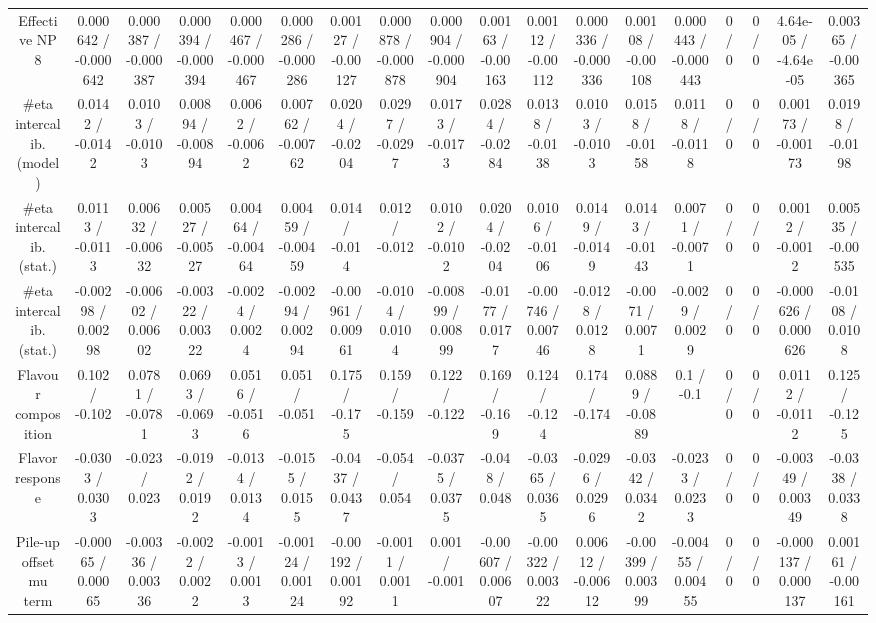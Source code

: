 \documentclass[10pt]{article}
\begin{document}
\begin{table}[htbp]
\begin{center}
\begin{tabular}{|c|c|c|c|c|c|c|c|c|c|c|c|c|c|c|c|c|c|}
  Effective NP 8 & 0.000642 / -0.000642 & 0.000387 / -0.000387 & 0.000394 / -0.000394 & 0.000467 / -0.000467 & 0.000286 / -0.000286 & 0.00127 / -0.00127 & 0.000878 / -0.000878 & 0.000904 / -0.000904 & 0.00163 / -0.00163 & 0.00112 / -0.00112 & 0.000336 / -0.000336 & 0.00108 / -0.00108 & 0.000443 / -0.000443 & 0 / 0 & 0 / 0 & 4.64e-05 / -4.64e-05 & 0.00365 / -0.00365 \\ 
  #eta intercalib. (model) & 0.0142 / -0.0142 & 0.0103 / -0.0103 & 0.00894 / -0.00894 & 0.0062 / -0.0062 & 0.00762 / -0.00762 & 0.0204 / -0.0204 & 0.0297 / -0.0297 & 0.0173 / -0.0173 & 0.0284 / -0.0284 & 0.0138 / -0.0138 & 0.0103 / -0.0103 & 0.0158 / -0.0158 & 0.0118 / -0.0118 & 0 / 0 & 0 / 0 & 0.00173 / -0.00173 & 0.0198 / -0.0198 \\ 
  #eta intercalib. (stat.) & 0.0113 / -0.0113 & 0.00632 / -0.00632 & 0.00527 / -0.00527 & 0.00464 / -0.00464 & 0.00459 / -0.00459 & 0.014 / -0.014 & 0.012 / -0.012 & 0.0102 / -0.0102 & 0.0204 / -0.0204 & 0.0106 / -0.0106 & 0.0149 / -0.0149 & 0.0143 / -0.0143 & 0.0071 / -0.0071 & 0 / 0 & 0 / 0 & 0.0012 / -0.0012 & 0.00535 / -0.00535 \\ 
  #eta intercalib. (stat.) & -0.00298 / 0.00298 & -0.00602 / 0.00602 & -0.00322 / 0.00322 & -0.0024 / 0.0024 & -0.00294 / 0.00294 & -0.00961 / 0.00961 & -0.0104 / 0.0104 & -0.00899 / 0.00899 & -0.0177 / 0.0177 & -0.00746 / 0.00746 & -0.0128 / 0.0128 & -0.0071 / 0.0071 & -0.0029 / 0.0029 & 0 / 0 & 0 / 0 & -0.000626 / 0.000626 & -0.0108 / 0.0108 \\ 
  Flavour composition & 0.102 / -0.102 & 0.0781 / -0.0781 & 0.0693 / -0.0693 & 0.0516 / -0.0516 & 0.051 / -0.051 & 0.175 / -0.175 & 0.159 / -0.159 & 0.122 / -0.122 & 0.169 / -0.169 & 0.124 / -0.124 & 0.174 / -0.174 & 0.0889 / -0.0889 & 0.1 / -0.1 & 0 / 0 & 0 / 0 & 0.0112 / -0.0112 & 0.125 / -0.125 \\ 
  Flavor response & -0.0303 / 0.0303 & -0.023 / 0.023 & -0.0192 / 0.0192 & -0.0134 / 0.0134 & -0.0155 / 0.0155 & -0.0437 / 0.0437 & -0.054 / 0.054 & -0.0375 / 0.0375 & -0.048 / 0.048 & -0.0365 / 0.0365 & -0.0296 / 0.0296 & -0.0342 / 0.0342 & -0.0233 / 0.0233 & 0 / 0 & 0 / 0 & -0.00349 / 0.00349 & -0.0338 / 0.0338 \\ 
  Pile-up offset mu term & -0.00065 / 0.00065 & -0.00336 / 0.00336 & -0.0022 / 0.0022 & -0.0013 / 0.0013 & -0.00124 / 0.00124 & -0.00192 / 0.00192 & -0.0011 / 0.0011 & 0.001 / -0.001 & -0.00607 / 0.00607 & -0.00322 / 0.00322 & 0.00612 / -0.00612 & -0.00399 / 0.00399 & -0.00455 / 0.00455 & 0 / 0 & 0 / 0 & -0.000137 / 0.000137 & 0.00161 / -0.00161 \\ 

\end{tabular}
\end{center}
\end{table}
\end{document}
